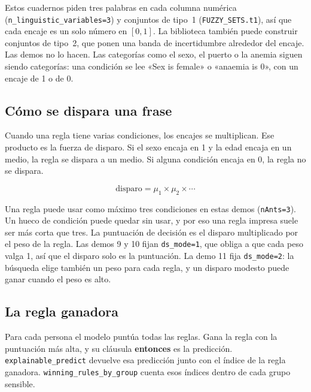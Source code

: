 \documentclass[11pt]{article}
\newcommand{\fn}[1]{\texttt{\small #1}}
\begin{document}
\noindent
Estos cuadernos piden tres palabras en cada columna numérica (\fn{n\_linguistic\_variables=3}) y conjuntos de tipo~1 (\fn{FUZZY\_SETS.t1}), así que cada encaje es un solo número en \([0,1]\). La biblioteca también puede construir conjuntos de tipo~2, que ponen una banda de incertidumbre alrededor del encaje. Las demos no lo hacen. Las categorías como el sexo, el puerto o la anemia siguen siendo categorías: una condición se lee «Sex is female» o «anaemia is 0», con un encaje de 1 o de 0.

\subsection{Cómo se dispara una frase}

Cuando una regla tiene varias condiciones, los encajes se multiplican. Ese producto es la fuerza de disparo. Si el sexo encaja en 1 y la edad encaja en un medio, la regla se dispara a un medio. Si alguna condición encaja en 0, la regla no se dispara.

\[
\text{disparo} = \mu_1 \times \mu_2 \times \cdots
\]

Una regla puede usar como máximo tres condiciones en estas demos (\fn{nAnts=3}). Un hueco de condición puede quedar sin usar, y por eso una regla impresa suele ser más corta que tres. La puntuación de decisión es el disparo multiplicado por el peso de la regla. Las demos 9 y 10 fijan \fn{ds\_mode=1}, que obliga a que cada peso valga 1, así que el disparo solo es la puntuación. La demo 11 fija \fn{ds\_mode=2}: la búsqueda elige también un peso para cada regla, y un disparo modesto puede ganar cuando el peso es alto.

\subsection{La regla ganadora}

Para cada persona el modelo puntúa todas las reglas. Gana la regla con la puntuación más alta, y su cláusula \textbf{entonces} es la predicción. \fn{explainable\_predict} devuelve esa predicción junto con el índice de la regla ganadora. \fn{winning\_rules\_by\_group} cuenta esos índices dentro de cada grupo sensible.
\end{document}
